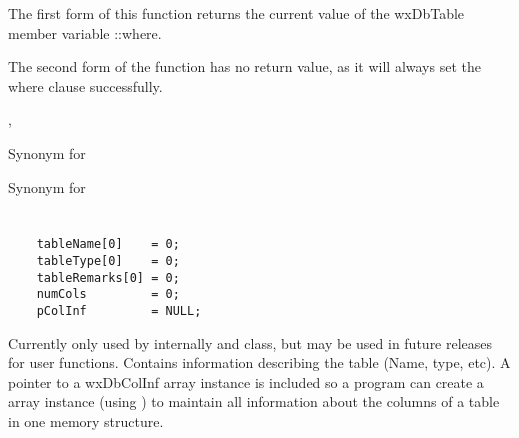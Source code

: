 


The first form of this function returns the current value of the wxDbTable 
member variable ::where.  

The second form of the function has no return value, as it will always set 
the where clause successfully. 


, 



\label{wxdbtableplusplus}


Synonym for 




\label{wxdbtableminusminus}


Synonym for 




\section{}\label{wxdbtableinf}

\begin{verbatim}
    tableName[0]    = 0;
    tableType[0]    = 0;
    tableRemarks[0] = 0;
    numCols         = 0;
    pColInf         = NULL;
\end{verbatim}


Currently only used by  internally 
and  class, but may be used in future releases for 
user functions.  Contains information describing the table (Name, type, etc). 
A pointer to a wxDbColInf array instance is included so a program can create a 
 array instance (using ) 
to maintain all information about the columns of a table in one memory 
structure.

